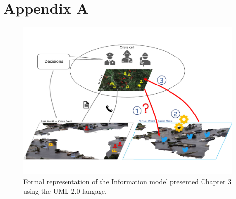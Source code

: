 \chapter{Appendix A}

\begin{landscape}
    \begin{figure}
        \includegraphics[width=\paperwidth,height=\paperheight,keepaspectratio]{figures/big-picture.pdf}
        \caption{Formal representation of the Information model presented Chapter 3 using the UML 2.0 langage.}
        \label{information:information-models-uml}
    \end{figure}
\end{landscape}

